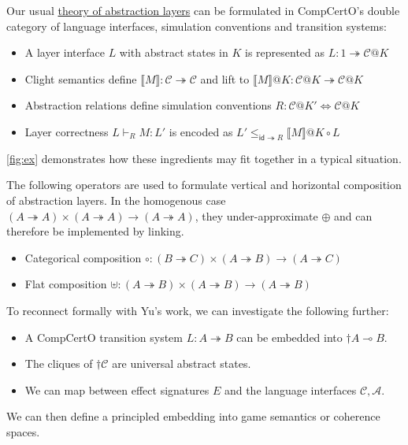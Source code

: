 \documentclass{article}
\begin{document}
Our usual
\href{https://certikos.github.io/rbgs-papers/thesis/thesis.pdf\#chapter.4}%
  {theory of abstraction layers}
can be formulated in CompCertO's double category of
language interfaces, simulation conventions and transition systems:
\begin{itemize}
  \item A layer interface $L$ with abstract states in $K$
    is represented as $L : 1 \twoheadrightarrow \mathcal{C}@K$
  \item Clight semantics define
    $\llbracket M \rrbracket : \mathcal{C} \twoheadrightarrow \mathcal{C}$
    and lift to
    $\llbracket M \rrbracket @ K :
     \mathcal{C}@K \twoheadrightarrow \mathcal{C}@K$
  \item Abstraction relations define simulation conventions
    $R : \mathcal{C}@K' \Leftrightarrow \mathcal{C}@K$
  \item Layer correctness
    $L \vdash_R M : L'$
    is encoded as
    $L' \le_{\mathsf{id} \twoheadrightarrow R}
     \llbracket M \rrbracket @K \circ L$
\end{itemize}
\autoref{fig:ex}
demonstrates how these ingredients may fit together
in a typical situation.

\newpage
The following operators
are used to formulate vertical and horizontal composition
of abstraction layers.
In the homogenous case
$(A \twoheadrightarrow A) \times
 (A \twoheadrightarrow A) \rightarrow
 (A \twoheadrightarrow A)$,
they under-approximate $\oplus$
and can therefore be implemented by linking.
\begin{itemize}
  \item Categorical composition \hfill
    $\circ :
      (B \twoheadrightarrow C) \times
      (A \twoheadrightarrow B) \rightarrow
      (A \twoheadrightarrow C) \qquad$
  \item Flat composition \hfill
    $\uplus :
      (A \twoheadrightarrow B) \times
      (A \twoheadrightarrow B) \rightarrow
      (A \twoheadrightarrow B) \qquad$
\end{itemize}
To reconnect formally with Yu's work,
we can investigate the following further:
\begin{itemize}
  \item A CompCertO transition system $L : A \twoheadrightarrow B$
    can be embedded into $\dagger A \multimap B$.
  \item The cliques of $\dagger \mathcal{C}$
    are universal abstract states.
  \item We can map between effect signatures $E$
    and the language interfaces $\mathcal{C}, \mathcal{A}$.
\end{itemize}
We can then define
a principled embedding
into game semantics or coherence spaces.
\end{document}
